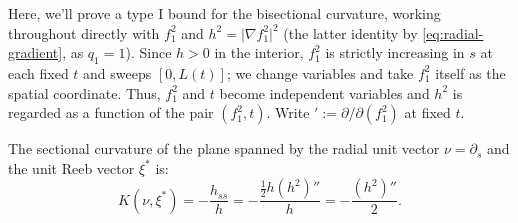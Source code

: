 \documentclass[11pt]{amsart}
\theoremstyle{plain}
\numberwithin{equation}{section}
\theoremstyle{definition}
\theoremstyle{remark}
\begin{document}
Here, we'll prove a type I bound for the bisectional curvature, working throughout directly with $f_1^2$ and $h^2 = \big| \nabla f_1^2 \big|^2$ (the latter identity by \eqref{eq:radial-gradient}, as $q_1 = 1$). Since $h > 0$ in the interior, $f_1^2$ is strictly increasing in $s$ at each fixed $t$ and sweeps $[ 0, L (t) ]$; we change variables %
and take $f_1^2$ itself as the spatial coordinate. Thus, $f_1^2$ and $t$ become {independent} variables and $h^2$ is regarded as a function of the pair $( f_1^2, t )$. Write ${}' := \partial / \partial ( f_1^2 )$ at fixed $t$.

\iffalse 
The sectional curvature of the plane spanned by the radial unit vector $\nu = \partial_s$ and the unit Reeb vector $\xi^*$ is:
\begin{equation}
	K(\nu, \xi^*) = -\frac{h_{ss}}{h}= -\frac{\frac{1}{2} h (h^2)''}{h} = -\frac{(h^2)''}{2}.
\end{equation}
\end{document}
